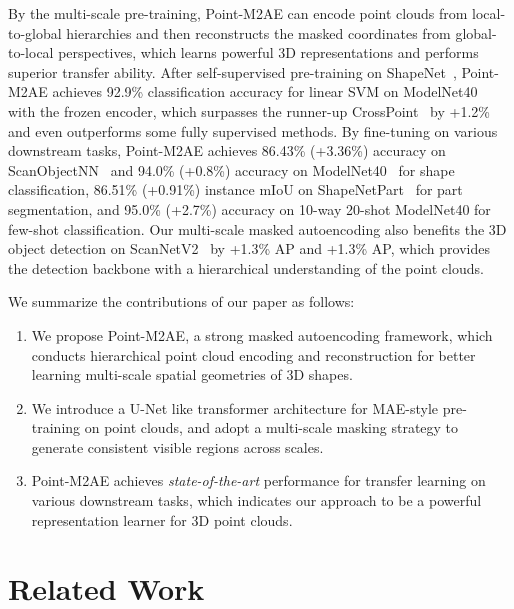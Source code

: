 \documentclass{article}
\begin{document}
By the multi-scale pre-training, Point-M2AE can encode point clouds from local-to-global hierarchies and then reconstructs the masked coordinates from global-to-local perspectives, which learns powerful 3D representations and performs superior transfer ability. After self-supervised pre-training on ShapeNet~\cite{chang2015shapenet}, Point-M2AE achieves 92.9\% classification accuracy for linear SVM on ModelNet40~\cite{modelnet40} with the frozen encoder, which surpasses the runner-up CrossPoint~\cite{afham2022crosspoint} by +1.2\% and even outperforms some fully supervised methods. By fine-tuning on various downstream tasks, Point-M2AE achieves 86.43\% (+3.36\%) accuracy on ScanObjectNN~\cite{scanobjectnn} and 94.0\% (+0.8\%) accuracy on ModelNet40~\cite{modelnet40} for shape classification, 86.51\% (+0.91\%) instance mIoU on ShapeNetPart~\cite{shapenetpart} for part segmentation, and 95.0\% (+2.7\%) accuracy on 10-way 20-shot ModelNet40 for few-shot classification. Our multi-scale masked autoencoding also benefits the 3D object detection on ScanNetV2~\cite{ScanNetV2} by +1.3\% AP and +1.3\% AP, which provides the detection backbone with a hierarchical understanding of the point clouds. 

We summarize the contributions of our paper as follows:
\begin{enumerate}
    \item We propose Point-M2AE, a strong masked autoencoding framework, which conducts hierarchical point cloud encoding and reconstruction for better learning multi-scale spatial geometries of 3D shapes.
    
    \item We introduce a U-Net like transformer architecture for MAE-style pre-training on point clouds, and adopt a multi-scale masking strategy to generate consistent visible regions across scales.
    
    \item Point-M2AE achieves \textit{state-of-the-art} performance for transfer learning on various downstream tasks, which indicates our approach to be a powerful representation learner for 3D point clouds.
\end{enumerate}

\section{Related Work}
\end{document}
